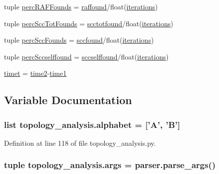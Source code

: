\begin{DoxyCompactItemize}
\item 
tuple \hyperlink{a00128_a51a66ce80f70aeab8bde70af9960e419}{perc\-R\-A\-F\-Founds} = \hyperlink{a00128_ad625a009a3da81a04b490e62975ecf39}{raffound}/float(\hyperlink{a00128_a2117e01e4647cbdecc0ece27cec1cff4}{iterations})
\item 
tuple \hyperlink{a00128_aee49954a6b9abb7c4bd677c17ed4013b}{perc\-Scc\-Tot\-Founds} = \hyperlink{a00128_ac05c0aaedb357a42df2d5f3915bbedfa}{scctotfound}/float(\hyperlink{a00128_a2117e01e4647cbdecc0ece27cec1cff4}{iterations})
\item 
tuple \hyperlink{a00128_a14f23c89de77042b80e78e1d9ab7b754}{perc\-Scc\-Founds} = \hyperlink{a00128_aa8258ef828502be89350332ae97a0d3a}{sccfound}/float(\hyperlink{a00128_a2117e01e4647cbdecc0ece27cec1cff4}{iterations})
\item 
tuple \hyperlink{a00128_a8bf55c62b8e7385526396a9003e343bb}{perc\-Sccselffound} = \hyperlink{a00128_aeacefe088f3283ea0e80ee31c0486d6d}{sccselffound}/float(\hyperlink{a00128_a2117e01e4647cbdecc0ece27cec1cff4}{iterations})
\item 
\hyperlink{a00128_a5b12bbbc66679be171ab082dbaeba90b}{timet} = \hyperlink{a00128_a44666efa43bfc08ab8305c8d325f7456}{time2}-\/\hyperlink{a00128_ac7160059dec8067db4645fa39feec359}{time1}
\end{DoxyCompactItemize}


\subsection{Variable Documentation}
\hypertarget{a00128_ab0d9c13eee214bf78b20760bf2835248}{
\subsubsection[{alphabet}]{\setlength{\rightskip}{0pt plus 5cm}list topology\-\_\-analysis.\-alphabet = \mbox{[}'A', 'B'\mbox{]}}}\label{a00128_ab0d9c13eee214bf78b20760bf2835248}


Definition at line 118 of file topology\-\_\-analysis.\-py.

\hypertarget{a00128_a6741aa05e3fb94565993dd2001401e98}{
\subsubsection[{args}]{\setlength{\rightskip}{0pt plus 5cm}tuple topology\-\_\-analysis.\-args = parser.\-parse\-\_\-args()}}\label{a00128_a6741aa05e3fb94565993dd2001401e98}


